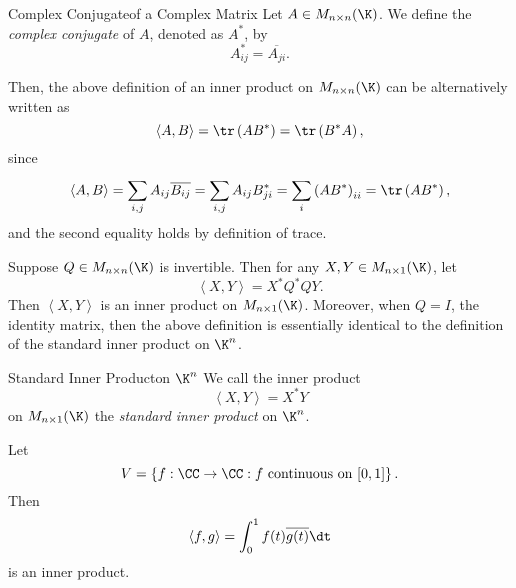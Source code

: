 \documentclass[linearalgebraII]{subfiles}
\begin{document}
    \begin{definition}{Complex Conjugate}{of a Complex Matrix}
        Let $A\in M_{n\times n}(\K)$. We define the \emph{complex conjugate} of $A$, denoted as $A^*$, by
        \begin{equation*}
            A^*_{ij} = \overline{A_{ji}}.
        \end{equation*}
    \end{definition}

    \noindent Then, the above definition of an inner product on $M_{n\times n}(\K)$ can be alternatively written as 
    \begin{equation*}
        \left\langle A, B\right\rangle = \tr\left( AB^* \right) = \tr\left( B^*A \right) ,
    \end{equation*}
    since
    \begin{equation*}
        \left\langle A, B\right\rangle = \sum^{}_{i,j} A_{ij}\overline{B_{ij}} = \sum^{}_{i,j} A_{ij}B^*_{ji} = \sum^{}_{i} \left( AB^* \right) _{ii} = \tr\left( AB^* \right),
    \end{equation*}
    and the second equality holds by definition of trace.

    \begin{remark}
        Suppose $Q\in M_{n\times n}(\K)$ is invertible. Then for any $X,Y\in M_{n\times 1}(\K)$, let
        \begin{equation*}
            \left\langle X, Y\right\rangle = X^*Q^*QY. 
        \end{equation*}
        Then $\left\langle X, Y\right\rangle $ is an inner product on $M_{n\times 1}(\K)$. Moreover, when $Q=I$, the identity matrix, then the above definition is essentially identical to the definition of the standard inner product on $\K^n$.
    \end{remark}

    \begin{definition}{Standard Inner Product}{on $\K^n$}
        We call the inner product
        \begin{equation*}
            \left\langle X, Y\right\rangle = X^*Y
        \end{equation*}
        on $M_{n\times 1}(\K)$ the \emph{standard inner product} on $\K^n$. 
    \end{definition}

    \begin{example}
        Let
        \begin{equation*}
            V = \left\lbrace f:\CC\to\CC: f\text{ continuous on }[0,1] \right\rbrace .
        \end{equation*}
        Then
        \begin{equation*}
            \left\langle f, g\right\rangle = \int^{1}_{0} f(t)\overline{g(t)}\dt
        \end{equation*}
        is an inner product.
    \end{example}
\end{document}
